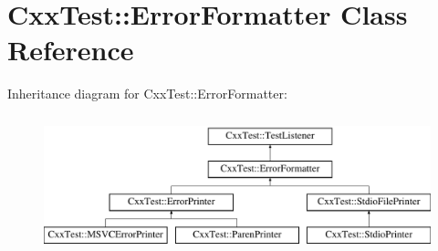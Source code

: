 \hypertarget{classCxxTest_1_1ErrorFormatter}{\section{Cxx\-Test\-:\-:Error\-Formatter Class Reference}
\label{classCxxTest_1_1ErrorFormatter}
}
Inheritance diagram for Cxx\-Test\-:\-:Error\-Formatter\-:\begin{figure}[H]
\begin{center}
\leavevmode
\includegraphics[height=4.000000cm]{classCxxTest_1_1ErrorFormatter}
\end{center}
\end{figure}
